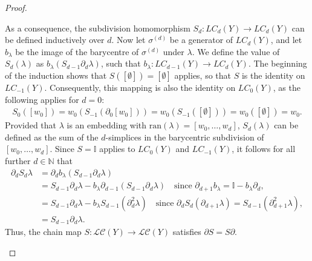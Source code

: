 \begin{proof}
\begin{enumerate}
	As a consequence, the subdivision homomorphism $S_d: LC_d(Y) \rightarrow LC_d(Y)$ can be defined inductively over $d$. Now let $\sigma^{(d)}$ be a generator of $LC_d(Y)$, and let $b_\lambda$ be the image of the barycentre of $\sigma^{(d)}$ under $\lambda$. We define the value of $S_d(\lambda)$ as $b_\lambda(S_{d-1}\partial_{d}\lambda)$, such that $b_\lambda: LC_{d-1}(Y) \rightarrow LC_d(Y)$. The beginning of the induction shows that $S([\emptyset]) = [\emptyset]$ applies, so that $S$ is the identity on $LC_{-1}(Y)$. Consequently, this mapping is also the identity on $LC_0(Y)$, as the following applies for $d=0$: 
	\begin{align}
		S_0([w_0]) = w_0(S_{-1}(\partial_0[w_0])) = w_0(S_{-1}([\emptyset])) = w_0([\emptyset]) = w_0. 
	\end{align}
	Provided that $\lambda$ is an embedding with $\text{ran}(\lambda) = [w_0, \ldots, w_d]$, $S_d(\lambda)$ can be defined as the sum of the $d$-simplices in the barycentric subdivision of $[w_0, \ldots, w_d]$. Since $S = \mathbb{I}$ applies to $LC_0(Y)$ and $LC_{-1}(Y)$, it follows for all further $d \in \mathbb{N}$ that
	\begin{align}
		\partial_{d} S_d\lambda & = \partial_d b_\lambda(S_{d-1}\partial_{d}\lambda) \nonumber\\
		                  & = S_{d-1}\partial_d\lambda - b_\lambda\partial_{d-1}(S_{d-1}\partial_d\lambda) \quad \text{since } \partial_{d+1} b_\lambda = \mathbb{I} - b_\lambda\partial_d, \nonumber\\
		                  & = S_{d-1}\partial_d\lambda - b_\lambda S_{d-1}(\partial^2_d\lambda) \quad \text{since } \partial_{d} S_{d}(\partial_{d+1}\lambda) = S_{d-1}(\partial^2_{d+1}\lambda),\nonumber\\
		                  & = S_{d-1}\partial_d\lambda.                                                                                     
	\end{align}
	Thus, the chain map $S: \mathcal{LC}(Y) \rightarrow \mathcal{LC}(Y)$ satisfies $\partial S = S\partial$.
		

\end{enumerate}
\end{proof}
